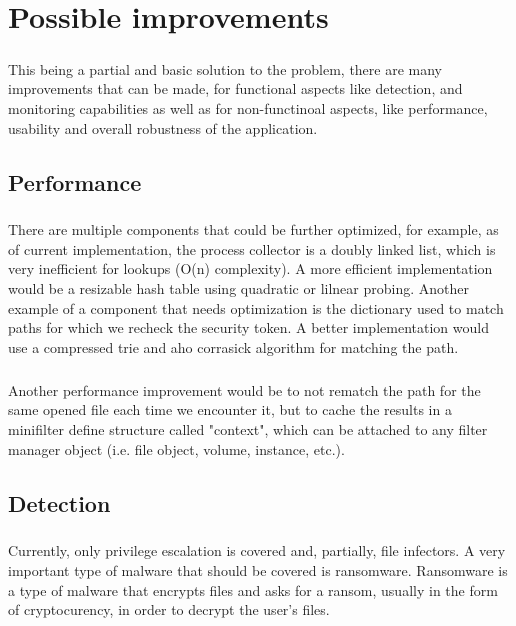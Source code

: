 \chapter{Possible improvements}
    \paragraph{}
    This being a partial and basic solution to the problem, there are many improvements that can be made, for functional aspects like detection,
    and monitoring capabilities as well as for non-functinoal aspects, like performance, usability and overall robustness of the application.

    \section{Performance}
        \paragraph{}
        There are multiple components that could be further optimized, for example, as of current implementation, the process collector is
        a doubly linked list, which is very inefficient for lookups (O(n) complexity). A more efficient implementation would be a resizable hash
        table using quadratic or lilnear probing. Another example of a component that needs optimization is the dictionary used to match paths
        for which we recheck the security token. A better implementation would use a compressed trie and aho corrasick algorithm for matching
        the path.

        \paragraph{}
        Another performance improvement would be to not rematch the path for the same opened file each time we encounter it, but to cache
        the results in a minifilter define structure called "context", which can be attached to any filter manager object (i.e. file object, 
        volume, instance, etc.).

    \section{Detection}
        \paragraph{}
        Currently, only privilege escalation is covered and, partially, file infectors. A very important type of malware that should be covered
        is ransomware. Ransomware is a type of malware that encrypts files and asks for a ransom, usually in the form of cryptocurency, in order
        to decrypt the user's files.

